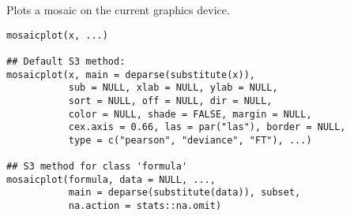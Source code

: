 %
\begin{Description}\relax
Plots a mosaic on the current graphics device.
\end{Description}
%
\begin{Usage}
\begin{verbatim}
mosaicplot(x, ...)

## Default S3 method:
mosaicplot(x, main = deparse(substitute(x)), 
           sub = NULL, xlab = NULL, ylab = NULL,
           sort = NULL, off = NULL, dir = NULL,
           color = NULL, shade = FALSE, margin = NULL,
           cex.axis = 0.66, las = par("las"), border = NULL,
           type = c("pearson", "deviance", "FT"), ...)

## S3 method for class 'formula'
mosaicplot(formula, data = NULL, ...,
           main = deparse(substitute(data)), subset,
           na.action = stats::na.omit)
\end{verbatim}
\end{Usage}
%
